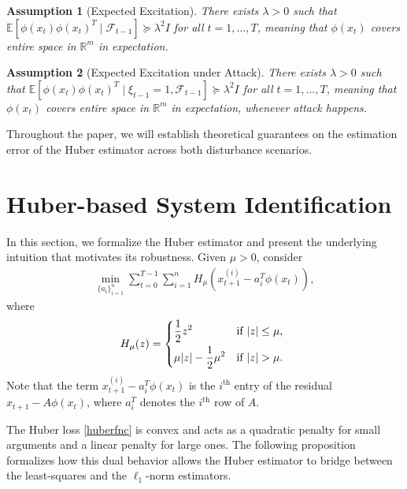 \documentclass[letterpaper,10pt,conference]{ieeeconf}
\makeatletter
\newcounter{parentassumption} %
\newenvironment{assumptionset}{%
  \refstepcounter{assumption}%
  \setcounter{parentassumption}{\value{assumption}}%
  \protected@edef\theparentassumption{\theassumption}%
  \setcounter{assumption}{0}%
  \renewcommand{\theassumption}{\theparentassumption\alph{assumption}}%
}{%
  \setcounter{assumption}{\value{parentassumption}}%
}
\theoremstyle{plain} %
\theoremstyle{plain} %
\theoremstyle{plain} %
\newtheorem{assumption}{Assumption}
\theoremstyle{plain}
\makeatother
\begin{document}
\begin{assumptionset}


\begin{assumption}[Expected Excitation]\label{as:excitation}
There exists $\lambda>0$ such that $\mathbb{E}[\phi(x_t)\phi(x_t)^T\mid  \mathcal{F}_{t-1}] \succeq \lambda^2 I$ for all $t=1,\dots, T$, meaning that $\phi(x_t)$ covers entire space in $\mathbb{R}^m$ in expectation.    
\end{assumption}

\begin{assumption}[Expected Excitation under Attack]\label{as:excitation_attack}
There exists $\lambda>0$ such that $\mathbb{E}[\phi(x_t)\phi(x_t)^T\mid \xi_{t-1}=1, \mathcal{F}_{t-1}] \succeq \lambda^2 I$ for all $t=1,\dots, T$, meaning that $\phi(x_t)$ covers entire space in $\mathbb{R}^m$ in expectation, whenever attack happens.
\end{assumption}
\end{assumptionset}

Throughout the paper, we will establish theoretical guarantees on the estimation error of the Huber estimator across both disturbance scenarios.


\section{Huber-based System Identification}\label{sec:huberbased}

In this section, we formalize the Huber estimator and present the underlying intuition that motivates its robustness.
Given $\mu>0$, consider
\begin{align}\tag{Huber estimator}  \label{hubermin}
    \min_{\{a_i\}_{i=1}^n} \sum_{t=0}^{T-1} \sum_{i=1}^n H_{\mu} (x_{t+1}^{(i)} - a_i^T \phi(x_t)), 
\end{align}
where 
\begin{align}\label{huberfnc}
    H_{\mu} (z) = \begin{dcases*}
        \frac{1}{2}z^2 & if $|z|\le \mu$, \\
         \mu |z| -\frac{1}{2}\mu^2 & if $|z|>\mu$.
    \end{dcases*}
\end{align}
Note that the term $x_{t+1}^{(i)} - a_i^T \phi(x_t)$ is the $i^\text{th}$ entry of the residual $x_{t+1}- A\phi(x_t)$, where $a_i^T$ denotes the $i^\text{th}$ row of $A$.

The Huber loss \eqref{huberfnc} is convex and acts as a quadratic penalty for small arguments and a linear penalty for large ones. 
The following proposition formalizes how this dual behavior allows the Huber estimator to bridge between the least-squares and the $\ell_1$-norm estimators.
\end{document}
